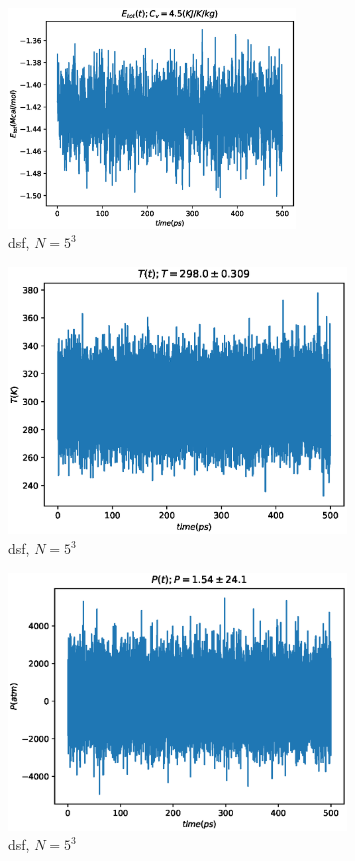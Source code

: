 \documentclass[a4paper,12pt]{article} %
\begin{document}
\begin{figure}[h!]
\begin{center}
\includegraphics[width=0.68\textwidth]{./pics/dsf_N5E}
\end{center}
\caption{dsf, $N = 5^3$} \label{img:pppm_H_N5}
\end{figure}

\newpage

\begin{figure}[h!]
\begin{center}
\includegraphics[width=0.8\textwidth]{./pics/dsf_N5T}
\end{center}
\caption{dsf, $N = 5^3$} \label{img:pppm_H_N5}
\end{figure}

\begin{figure}[h!]
\begin{center}
\includegraphics[width=0.8\textwidth]{./pics/dsf_N5P}
\end{center}
\caption{dsf, $N = 5^3$} \label{img:pppm_H_N5}
\end{figure}
\end{document}
